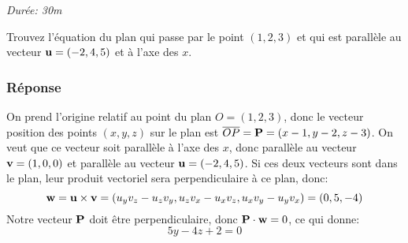 \emph{Durée: 30m}

Trouvez l'équation du plan qui passe par le point \((1,2,3)\) et qui est
parallèle au vecteur \({\bf u} = (-2,4,5)\) et à l'axe des \(x\).

\subsubsection{Réponse}

On prend l'origine relatif au point du plan \(O = (1,2,3)\), donc le
vecteur position des points \((x,y,z)\) sur le plan est
\(\overline{OP} = {\bf P} = (x-1, y-2, z-3)\). On veut que ce vecteur
soit parallèle à l'axe des \(x\), donc parallèle au vecteur
\({\bf v} = (1,0,0)\) et parallèle au vecteur \({\bf u} = (-2,4,5)\). Si
ces deux vecteurs sont dans le plan, leur produit vectoriel sera
perpendiculaire à ce plan, donc: \[
{\bf w} = {\bf u} \times {\bf v} = (u_y v_z - u_z v_y, u_z v_x - u_x v_z, u_x v_y - u_y v_x) = (0,5,-4)
\] Notre vecteur \({\bf P}\) doit être perpendiculaire, donc
\({\bf P} \cdot {\bf w} = 0\), ce qui donne: \[
5y- 4z + 2 = 0 
\]
